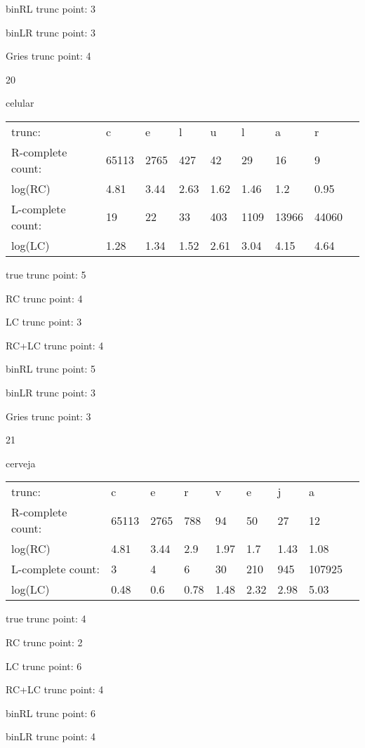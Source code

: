\documentclass[10pt]{article}
\begin{document}
binRL trunc point: 3

binLR trunc point: 3

Gries trunc point: 4

\vspace{1em}

20

celular

\begin{tabular}{l|llllllll}
trunc: & c & e & l & u & l & a & r & \\ 
R-complete count: & 65113 & 2765 & 427 & 42 & 29 & 16 & 9 & \\ 
log(RC) & 4.81 & 3.44 & 2.63 & 1.62 & 1.46 & 1.2 & 0.95 & \\ 
L-complete count: & 19 & 22 & 33 & 403 & 1109 & 13966 & 44060 & \\ 
log(LC) & 1.28 & 1.34 & 1.52 & 2.61 & 3.04 & 4.15 & 4.64 & \\ 
\end{tabular}

true trunc point: 5

RC trunc point: 4

LC trunc point: 3

RC+LC trunc point: 4

binRL trunc point: 5

binLR trunc point: 3

Gries trunc point: 3

\newpage

21

cerveja

\begin{tabular}{l|llllllll}
trunc: & c & e & r & v & e & j & a & \\ 
R-complete count: & 65113 & 2765 & 788 & 94 & 50 & 27 & 12 & \\ 
log(RC) & 4.81 & 3.44 & 2.9 & 1.97 & 1.7 & 1.43 & 1.08 & \\ 
L-complete count: & 3 & 4 & 6 & 30 & 210 & 945 & 107925 & \\ 
log(LC) & 0.48 & 0.6 & 0.78 & 1.48 & 2.32 & 2.98 & 5.03 & \\ 
\end{tabular}

true trunc point: 4

RC trunc point: 2

LC trunc point: 6

RC+LC trunc point: 4

binRL trunc point: 6

binLR trunc point: 4
\end{document}

